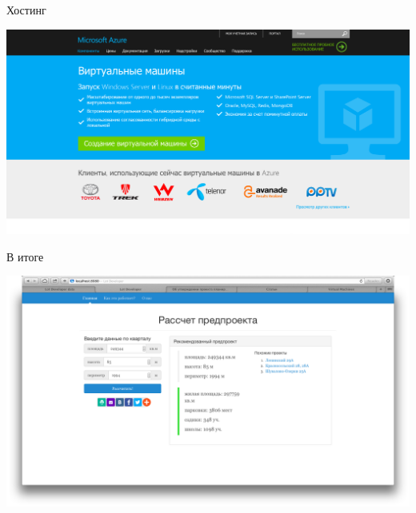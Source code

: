 \documentclass[14pt, fleqn, xcolor={dvipsnames, table}]{beamer}
\begin{document}
        \begin{frame}{Хостинг}
            \begin{center}
                \includegraphics[scale=0.25]{azure.png}
            \end{center}
        \end{frame}
        
        \begin{frame}{В итоге}
            \begin{center}
                \includegraphics[scale=0.23]{example.png}
            \end{center}
        \end{frame}
        
\end{document}
